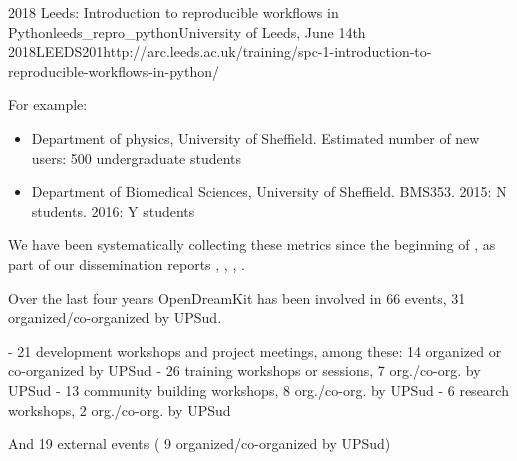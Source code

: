 \begin{Aim 1}
\begin{Aim 2}
\begin{event}{2018 Leeds: Introduction to reproducible workflows in Python}{leeds_repro_python}{University of Leeds, June 14th 2018}{LEEDS}{20}{1}{http://arc.leeds.ac.uk/training/spc-1-introduction-to-reproducible-workflows-in-python/}
\begin{itemize}
\begin{itemize}
  For example:
  \begin{itemize}
  \item Department of physics, University of Sheffield. Estimated
    number of new users: 500 undergraduate students
  \item Department of Biomedical Sciences, University of Sheffield.
    BMS353. 2015: N students. 2016: Y students
  \end{itemize}
\end{itemize}

We have been systematically collecting these metrics since the
beginning of \ODK, as part of our dissemination reports
, ,
, .

Over the last four years OpenDreamKit has been involved in 66 events, 31 organized/co-organized by UPSud.

                        - 21 development workshops and project meetings, among these: 14 organized or co-organized by UPSud
                        - 26 training workshops or sessions,  7 org./co-org. by UPSud
                        - 13 community building workshops, 8 org./co-org. by UPSud
                        - 6 research workshops, 2 org./co-org. by UPSud

And 19 external events ( 9 organized/co-organized by UPSud) 

















\end{itemize}
\end{event}
\end{Aim 2}
\end{Aim 1}
